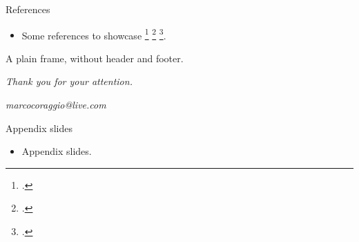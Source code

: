\documentclass[t]{lib/SMbeamer}
\begin{document}
\begin{frame}{References}
  \begin{itemize}
    \item Some references to showcase \footcite{smith2024interesting} \footcite{smith2025interesting} \footcite{smith2026interesting}.
      \end{itemize}
\end{frame}


\begin{frame}[plain,c]
  \centering%
  A plain frame, without header and footer.
\end{frame}


\begin{frameBorders}
  \centering%
  \textit{Thank you for your attention.}
  
  {\small \color{colorAccentLight}\textit{marcocoraggio@live.com}}
\end{frameBorders}


\appendix


\begin{frame}{Appendix slides}
  \begin{itemize}
    \item Appendix slides.
  \end{itemize}
\end{frame}

\end{document}
